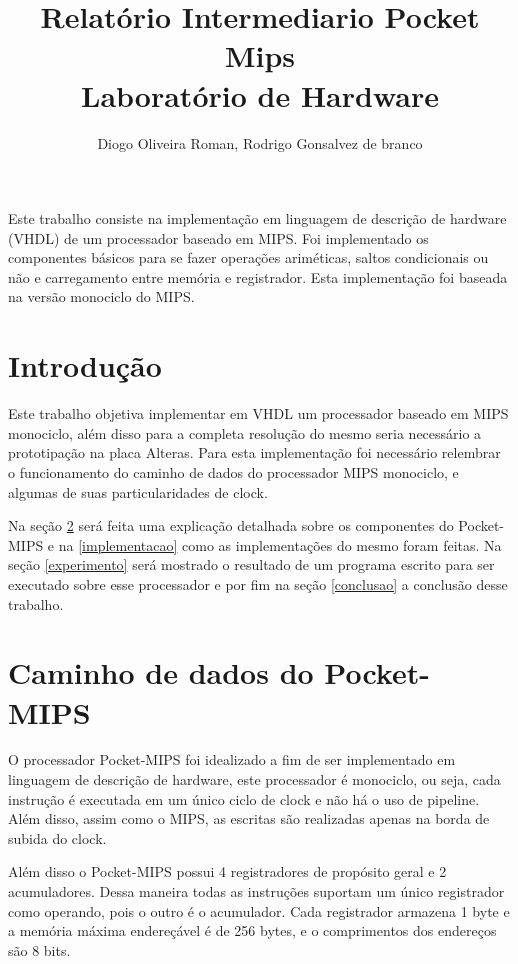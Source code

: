 \documentclass[12pt]{article}
\title{Relatório Intermediario Pocket Mips\\ Laboratório de Hardware}
\author{Diogo Oliveira Roman\inst{1}, Rodrigo Gonsalvez de branco\inst{1}}
\begin{document}
 

\maketitle

\begin{abstract}
\end{abstract}
     
\begin{resumo} 
Este trabalho consiste na implementação em linguagem de descrição de hardware (VHDL) de um processador baseado em MIPS. Foi implementado os componentes básicos para se fazer operações ariméticas, saltos condicionais ou não e carregamento entre memória e registrador. Esta implementação foi baseada na versão monociclo do MIPS.
\end{resumo}


\section{Introdução}
Este trabalho objetiva implementar em VHDL um processador baseado em MIPS monociclo, além disso para a completa resolução do mesmo seria necessário a prototipação na placa Alteras.
Para esta implementação foi necessário relembrar o funcionamento do caminho de dados do processador MIPS monociclo, e algumas de suas particularidades de clock.

Na seção \ref{mips} será feita uma explicação detalhada sobre os componentes do Pocket-MIPS e na \ref{implementacao} como as implementações do mesmo foram feitas. Na seção \ref{experimento} será mostrado o resultado de um programa escrito para ser executado sobre esse processador e por fim na seção \ref{conclusao} a conclusão desse trabalho.

\section{Caminho de dados do Pocket-MIPS} 
\label{mips}

O processador Pocket-MIPS foi idealizado a fim de ser implementado em linguagem de descrição de hardware, este processador é monociclo, ou seja, cada instrução é executada em um único ciclo de clock e não há o uso de pipeline. Além disso, assim como o MIPS, as escritas são realizadas apenas na borda de subida do clock.

Além disso o Pocket-MIPS possui 4 registradores de propósito geral e 2 acumuladores. Dessa maneira todas as instruções suportam um único registrador como operando, pois o outro é o acumulador. Cada registrador armazena 1 byte e a memória máxima endereçável é de 256 bytes, e o comprimentos dos endereços são 8 bits.
\end{document}
